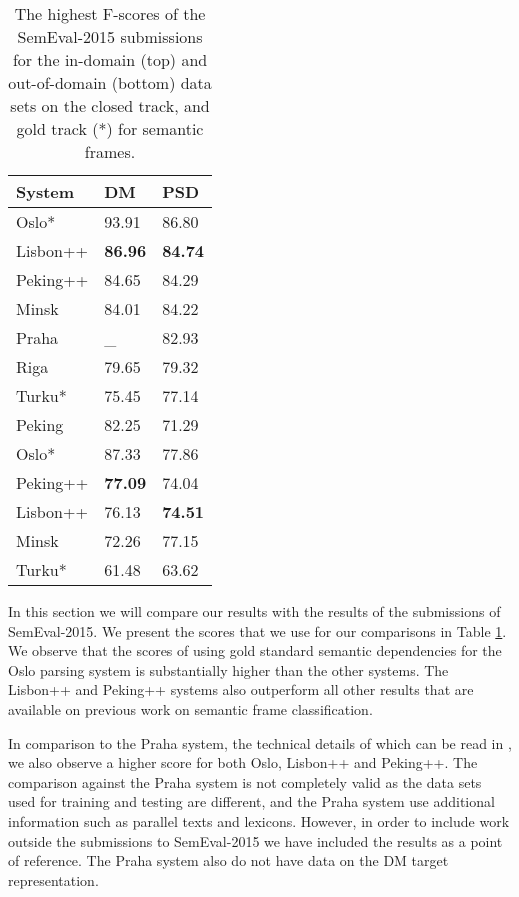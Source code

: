 \begin{table}
    \centering
    \smaller[0.2]
    \begin{tabular}{@{}lll@{}}
        \toprule
        \textbf{System} & \textbf{DM} & \textbf{PSD} \\
        \midrule
        Oslo* & 93.91 & 86.80 \\
        Lisbon++ & \textbf{86.96} & \textbf{84.74} \\
        Peking++ & 84.65 & 84.29 \\
        Minsk & 84.01 & 84.22 \\
        Praha & \_ &  82.93 \\
        Riga & 79.65 & 79.32 \\
        Turku* & 75.45 & 77.14 \\
        Peking & 82.25 & 71.29 \\
        \midrule
        Oslo* & 87.33 & 77.86 \\
        Peking++ & \textbf{77.09} & 74.04 \\
        Lisbon++ & 76.13 & \textbf{74.51} \\
        Minsk & 72.26 & 77.15 \\
        Turku* & 61.48 & 63.62 \\
        \bottomrule
    \end{tabular}
    \caption{The highest F-scores of the SemEval-2015 submissions for the in-domain (top) and out-of-domain (bottom) data sets on the closed track, and gold track (*) for semantic frames.}
    \label{table:scores}
\end{table}

In this section we will compare our results with the results of the submissions of SemEval-2015. We present the scores that we use for our comparisons in Table \ref{table:scores}. We observe that the scores of using gold standard semantic dependencies for the Oslo parsing system is substantially higher than the other systems. The Lisbon++ and Peking++ systems also outperform all other results that are available on previous work on semantic frame classification.

In comparison to the Praha system, the technical details of which can be read in , we also observe a higher score for both Oslo, Lisbon++ and Peking++. The comparison against the Praha system is not completely valid as the data sets used for training and testing are different, and the Praha system use additional information such as parallel texts and lexicons. However, in order to include work outside the submissions to SemEval-2015 we have included the results as a point of reference. The Praha system also do not have data on the DM target representation.

